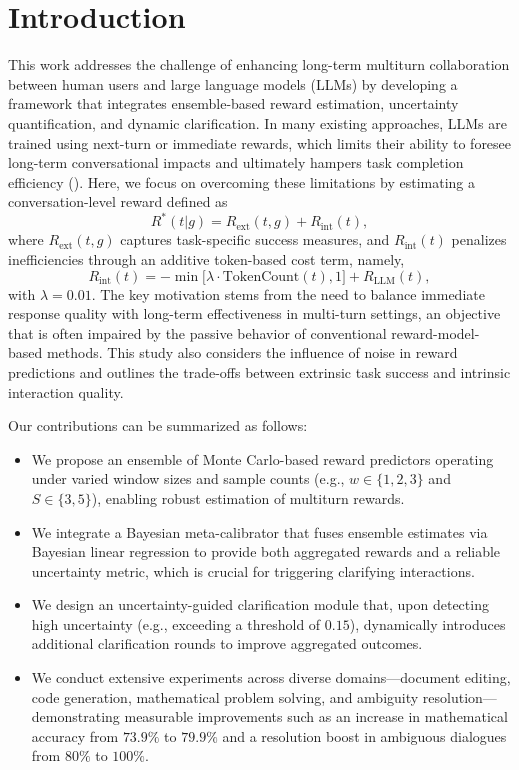 \documentclass{article} %
\begin{document}
\section{Introduction}
This work addresses the challenge of enhancing long-term multiturn collaboration between human users and large language models (LLMs) by developing a framework that integrates ensemble-based reward estimation, uncertainty quantification, and dynamic clarification. In many existing approaches, LLMs are trained using next-turn or immediate rewards, which limits their ability to foresee long-term conversational impacts and ultimately hampers task completion efficiency (\cite{wu2025collabllm}). Here, we focus on overcoming these limitations by estimating a conversation-level reward defined as 
\[
R^*(t|g) = R_{\text{ext}}(t,g) + R_{\text{int}}(t),
\]
where \(R_{\text{ext}}(t,g)\) captures task-specific success measures, and \(R_{\text{int}}(t)\) penalizes inefficiencies through an additive token-based cost term, namely, 
\[
R_{\text{int}}(t) = -\min\bigl[\lambda \cdot \text{TokenCount}(t), 1\bigr] + R_{\text{LLM}}(t),
\]
with \(\lambda = 0.01\). The key motivation stems from the need to balance immediate response quality with long-term effectiveness in multi-turn settings, an objective that is often impaired by the passive behavior of conventional reward-model-based methods. This study also considers the influence of noise in reward predictions and outlines the trade-offs between extrinsic task success and intrinsic interaction quality.

Our contributions can be summarized as follows:
\begin{itemize}
    \item We propose an ensemble of Monte Carlo-based reward predictors operating under varied window sizes and sample counts (e.g., \(w \in \{1,2,3\}\) and \(S \in \{3,5\}\)), enabling robust estimation of multiturn rewards.
    \item We integrate a Bayesian meta-calibrator that fuses ensemble estimates via Bayesian linear regression to provide both aggregated rewards and a reliable uncertainty metric, which is crucial for triggering clarifying interactions.
    \item We design an uncertainty-guided clarification module that, upon detecting high uncertainty (e.g., exceeding a threshold of \(0.15\)), dynamically introduces additional clarification rounds to improve aggregated outcomes.
    \item We conduct extensive experiments across diverse domains—document editing, code generation, mathematical problem solving, and ambiguity resolution—demonstrating measurable improvements such as an increase in mathematical accuracy from \(73.9\%\) to \(79.9\%\) and a resolution boost in ambiguous dialogues from \(80\%\) to \(100\%\).
\end{itemize}
\end{document}
